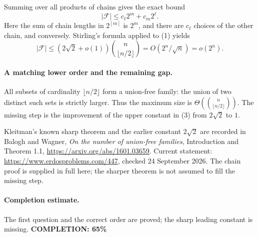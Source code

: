 Summing over all products of chains gives the exact bound
\[
 |\mathcal F|\leq c_\ell 2^m+c_m2^\ell.
 \tag{2}
\]
Here the sum of chain lengths in \(2^{[m]}\) is \(2^m\), and
there are \(c_\ell\) choices of the other chain, and conversely.
Stirling's formula applied to (1) yields
\[
 |\mathcal F|\leq
 (2\sqrt2+o(1))\binom n{\lfloor n/2\rfloor}
 =O(2^n/\sqrt n)=o(2^n).
 \tag{3}
\]

\paragraph{A matching lower order and the remaining gap.}
All subsets of cardinality \(\lfloor n/2\rfloor\) form a union-free
family: the union of two distinct such sets is strictly larger.
Thus the maximum size is \(\Theta(\binom n{\lfloor n/2\rfloor})\).
The missing step is the improvement of the upper constant in (3)
from \(2\sqrt2\) to \(1\).

Kleitman's known sharp theorem and the earlier constant \(2\sqrt2\)
are recorded in Balogh and Wagner, \emph{On the number of union-free
families}, Introduction and Theorem 1.1,
\url{https://arxiv.org/abs/1601.03659}.
Current statement: \url{https://www.erdosproblems.com/447},
checked 24 September 2026. The chain proof is supplied in full here;
the sharper theorem is not assumed to fill the missing step.

\paragraph{Completion estimate.}
The first question and the correct order are proved; the sharp leading constant is missing.
\textbf{COMPLETION: 65\%}
